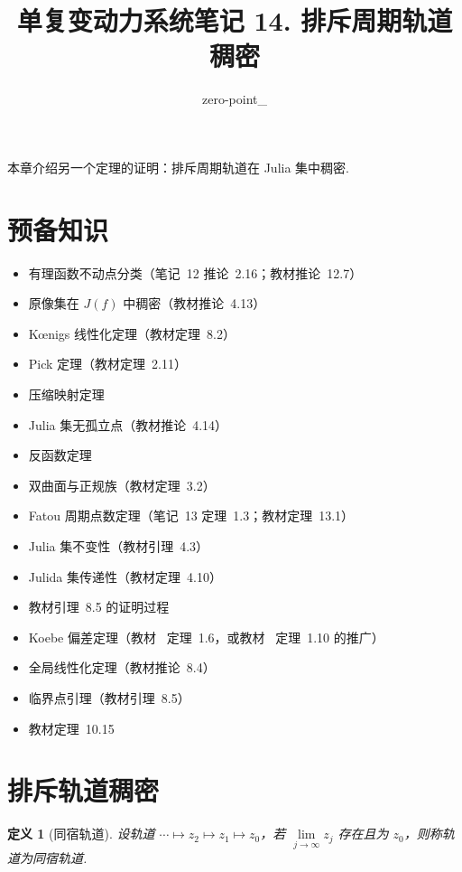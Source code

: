 \documentclass[11pt, a4paper, oneside]{ctexart}
\title{单复变动力系统笔记 14. 排斥周期轨道稠密}
\author{zero-point\_}
\newtheorem{definition}[theorem]{定义}
\begin{document}
	\maketitle

    本章介绍另一个定理的证明：排斥周期轨道在 Julia 集中稠密.

    \section{预备知识}
    \begin{itemize}
        \item 有理函数不动点分类（笔记~12 推论~2.16；教材推论~12.7）
        \item 原像集在 $J(f)$ 中稠密（教材推论~4.13）
        \item Kœnigs 线性化定理（教材定理~8.2）
        \item Pick 定理（教材定理~2.11）
        \item 压缩映射定理
        \item Julia 集无孤立点（教材推论~4.14）
        \item 反函数定理
        \item 双曲面与正规族（教材定理~3.2）
        \item Fatou 周期点数定理（笔记~13 定理~1.3；教材定理~13.1）
        \item Julia 集不变性（教材引理~4.3）
        \item Julida 集传递性（教材定理~4.10）
        \item 教材引理~8.5 的证明过程
        \item Koebe 偏差定理（教材~\cite{Carleson} 定理~1.6，或教材~\cite{Carleson} 定理~1.10 的推广）
        \item 全局线性化定理（教材推论~8.4）
        \item 临界点引理（教材引理~8.5）
        \item 教材定理~10.15
    \end{itemize}

    \section{排斥轨道稠密}
    \begin{definition}[同宿轨道]
        设轨道 $\cdots\mapsto z_2\mapsto z_1\mapsto z_0$，若 $\lim\limits_{j\to\infty}z_j$ 存在且为 $z_0$，则称轨道为同宿轨道.
    \end{definition}
\end{document}
